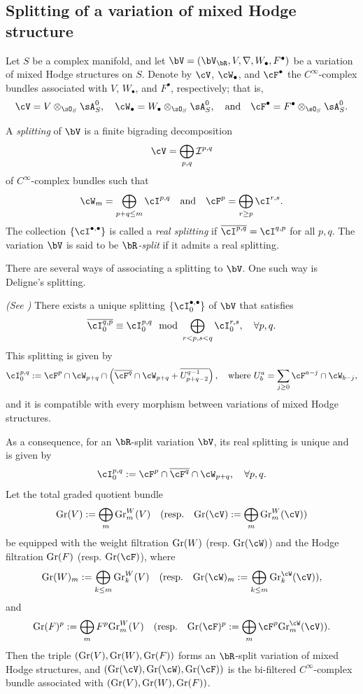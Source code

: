 \documentclass[11pt,letterpaper]{amsart}
\numberwithin{equation}{section}
\begin{document}
	\subsection{Splitting of a variation of mixed Hodge structure}
	Let $S$ be a complex manifold, and let $\bV = (\bV_{\bR}, V, \nabla, W_\bullet, F^\bullet)$ be a variation of mixed Hodge structures on $S$. Denote by $\cV$, $\cW_\bullet$, and $\cF^\bullet$ the $C^\infty$-complex bundles associated with $V$, $W_\bullet$, and $F^\bullet$, respectively; that is,  
	$$
	\cV = V \otimes_{\sO_S} \sA^0_S, \quad \cW_\bullet = W_\bullet \otimes_{\sO_S} \sA^0_S, \quad \text{and} \quad \cF^\bullet = F^\bullet \otimes_{\sO_S} \sA^0_S.
	$$
	\begin{defn}  
		A \emph{splitting} of $\bV$ is a finite bigrading decomposition  
		$$
		\cV = \bigoplus_{p,q} \mathcal{I}^{p,q}
		$$  
		of $C^\infty$-complex bundles such that  
		$$
		\cW_m = \bigoplus_{p+q \leq m} \cI^{p,q} \quad \text{and} \quad \cF^p = \bigoplus_{r \geq p} \cI^{r,s}.
		$$  
		The collection $\{\cI^{\bullet,\bullet}\}$ is called a \emph{real splitting} if $\overline{\cI^{p,q}} = \cI^{q,p}$ for all $p, q$. The variation $\bV$ is said to be \emph{$\bR$-split} if it admits a real splitting.  
	\end{defn}
	There are several ways of associating a splitting to $\bV$. One such way is Deligne's splitting.      
	\begin{prop} \emph{(See \cite[Theorem 2.13]{Cattani_Kaplan_Schmid1986})}  
		There exists a unique splitting $\{\cI^{\bullet,\bullet}_0\}$ of $\bV$ that satisfies  
		$$
		\overline{\cI^{q,p}_0} \equiv \cI^{p,q}_0 \mod \bigoplus_{r < p, s < q} \cI^{r,s}_0, \quad \forall p, q.
		$$  
		This splitting is given by  
		$$
		\cI^{p,q}_0 := \cF^p \cap \cW_{p+q} \cap \left( \overline{\cF^q} \cap \cW_{p+q} + \overline{U^{q-1}_{p+q-2}} \right), \quad \text{where } U^a_b = \sum_{j \geq 0} \cF^{a-j} \cap \cW_{b-j},
		$$  
		and it is compatible with every morphism between variations of mixed Hodge structures.  
	\end{prop}  
	As a consequence, for an $\bR$-split variation $\bV$, its real splitting is unique and is given by  
	$$
	\cI^{p,q}_0 := \cF^p \cap \overline{\cF^q} \cap \cW_{p+q}, \quad \forall p, q.
	$$
	Let the total graded quotient bundle  
	$$
	{\rm Gr}(V) := \bigoplus_m {\rm Gr}^W_m(V) \quad (\text{resp.} \quad {\rm Gr}(\cV) := \bigoplus_m {\rm Gr}^W_m(\cV))
	$$  
	be equipped with the weight filtration ${\rm Gr}(W)$ (resp. ${\rm Gr}(\cW)$) and the Hodge filtration ${\rm Gr}(F)$ (resp. ${\rm Gr}(\cF)$), where  
	$$
	{\rm Gr}(W)_m := \bigoplus_{k \leq m} {\rm Gr}^W_k(V) \quad (\text{resp.} \quad {\rm Gr}(\cW)_m := \bigoplus_{k \leq m} {\rm Gr}^\cW_k(\cV)),
	$$  
	and  
	$$
	{\rm Gr}(F)^p := \bigoplus_m F^p {\rm Gr}^W_m(V) \quad (\text{resp.} \quad {\rm Gr}(\cF)^p := \bigoplus_m \cF^p {\rm Gr}^\cW_m(\cV)).
	$$  
	Then the triple $({\rm Gr}(V), {\rm Gr}(W), {\rm Gr}(F))$ forms an $\bR$-split variation of mixed Hodge structures, and $({\rm Gr}(\cV), {\rm Gr}(\cW), {\rm Gr}(\cF))$ is the bi-filtered $C^\infty$-complex bundle associated with $({\rm Gr}(V), {\rm Gr}(W), {\rm Gr}(F))$. 
	
\end{document}
